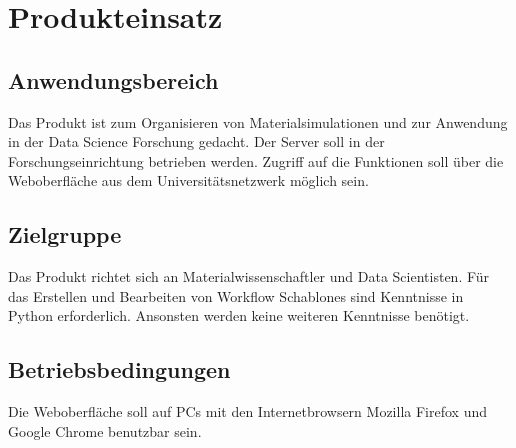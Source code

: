 \chapter{Produkteinsatz}
\section{Anwendungsbereich}
Das Produkt ist zum Organisieren von Materialsimulationen und zur Anwendung in der Data Science Forschung gedacht.
Der Server soll in der Forschungseinrichtung betrieben werden.
Zugriff auf die Funktionen soll über die Weboberfläche aus dem Universitätsnetzwerk möglich sein.

\section{Zielgruppe}
Das Produkt richtet sich an Materialwissenschaftler und Data Scientisten.
Für das Erstellen und Bearbeiten von \glspl{Workflow Schablone} sind Kenntnisse in \gls{Python} erforderlich. Ansonsten werden keine weiteren Kenntnisse benötigt.

\section{Betriebsbedingungen}
Die Weboberfläche soll auf PCs mit den Internetbrowsern Mozilla Firefox und Google Chrome benutzbar sein.
